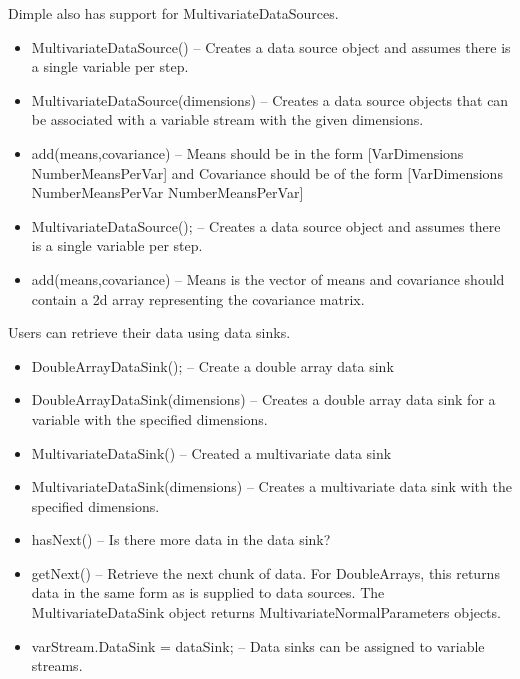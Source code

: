 Dimple also has support for MultivariateDataSources.

\ifmatlab
\begin{itemize}
\item MultivariateDataSource() -- Creates a data source object and assumes there is a single variable per step.
\item MultivariateDataSource(dimensions) -- Creates a data source objects that can be associated with a variable stream with the given dimensions.
\item add(means,covariance) -- Means should be in the form [VarDimensions NumberMeansPerVar] and Covariance should be of the form [VarDimensions NumberMeansPerVar NumberMeansPerVar] 
\end{itemize}
\fi

\ifjava
\begin{itemize}
\item MultivariateDataSource(); -- Creates a data source object and assumes there is a single variable per step.
\item add(means,covariance) -- Means is the vector of means and covariance should contain a 2d array representing the covariance matrix.
\end{itemize}
\fi


Users can retrieve their data using data sinks.

\ifmatlab
\begin{itemize}
\item DoubleArrayDataSink(); -- Create a double array data sink
\item DoubleArrayDataSink(dimensions) -- Creates a double array data sink for a variable with the specified dimensions.
\item MultivariateDataSink() -- Created a multivariate data sink
\item MultivariateDataSink(dimensions) -- Creates a multivariate data sink with the specified dimensions.
\item hasNext() -- Is there more data in the data sink?
\item getNext() -- Retrieve the next chunk of data.  For DoubleArrays, this returns data in the same form as is supplied to data sources.  The MultivariateDataSink object returns MultivariateNormalParameters objects.
\item varStream.DataSink = dataSink; -- Data sinks can be assigned to variable streams.
\end{itemize}
\fi

